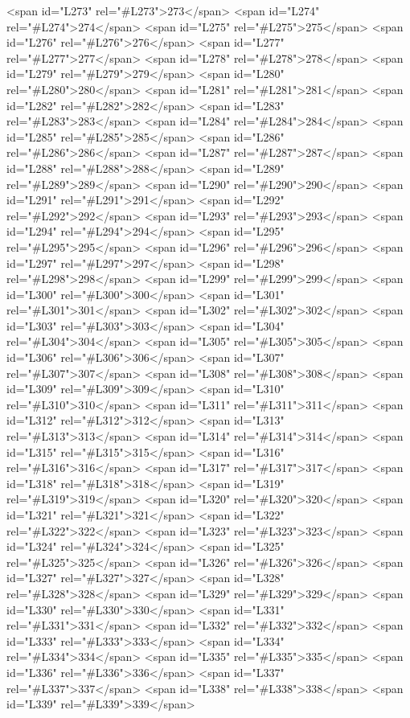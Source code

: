 <span id="L273" rel="#L273">273</span>
<span id="L274" rel="#L274">274</span>
<span id="L275" rel="#L275">275</span>
<span id="L276" rel="#L276">276</span>
<span id="L277" rel="#L277">277</span>
<span id="L278" rel="#L278">278</span>
<span id="L279" rel="#L279">279</span>
<span id="L280" rel="#L280">280</span>
<span id="L281" rel="#L281">281</span>
<span id="L282" rel="#L282">282</span>
<span id="L283" rel="#L283">283</span>
<span id="L284" rel="#L284">284</span>
<span id="L285" rel="#L285">285</span>
<span id="L286" rel="#L286">286</span>
<span id="L287" rel="#L287">287</span>
<span id="L288" rel="#L288">288</span>
<span id="L289" rel="#L289">289</span>
<span id="L290" rel="#L290">290</span>
<span id="L291" rel="#L291">291</span>
<span id="L292" rel="#L292">292</span>
<span id="L293" rel="#L293">293</span>
<span id="L294" rel="#L294">294</span>
<span id="L295" rel="#L295">295</span>
<span id="L296" rel="#L296">296</span>
<span id="L297" rel="#L297">297</span>
<span id="L298" rel="#L298">298</span>
<span id="L299" rel="#L299">299</span>
<span id="L300" rel="#L300">300</span>
<span id="L301" rel="#L301">301</span>
<span id="L302" rel="#L302">302</span>
<span id="L303" rel="#L303">303</span>
<span id="L304" rel="#L304">304</span>
<span id="L305" rel="#L305">305</span>
<span id="L306" rel="#L306">306</span>
<span id="L307" rel="#L307">307</span>
<span id="L308" rel="#L308">308</span>
<span id="L309" rel="#L309">309</span>
<span id="L310" rel="#L310">310</span>
<span id="L311" rel="#L311">311</span>
<span id="L312" rel="#L312">312</span>
<span id="L313" rel="#L313">313</span>
<span id="L314" rel="#L314">314</span>
<span id="L315" rel="#L315">315</span>
<span id="L316" rel="#L316">316</span>
<span id="L317" rel="#L317">317</span>
<span id="L318" rel="#L318">318</span>
<span id="L319" rel="#L319">319</span>
<span id="L320" rel="#L320">320</span>
<span id="L321" rel="#L321">321</span>
<span id="L322" rel="#L322">322</span>
<span id="L323" rel="#L323">323</span>
<span id="L324" rel="#L324">324</span>
<span id="L325" rel="#L325">325</span>
<span id="L326" rel="#L326">326</span>
<span id="L327" rel="#L327">327</span>
<span id="L328" rel="#L328">328</span>
<span id="L329" rel="#L329">329</span>
<span id="L330" rel="#L330">330</span>
<span id="L331" rel="#L331">331</span>
<span id="L332" rel="#L332">332</span>
<span id="L333" rel="#L333">333</span>
<span id="L334" rel="#L334">334</span>
<span id="L335" rel="#L335">335</span>
<span id="L336" rel="#L336">336</span>
<span id="L337" rel="#L337">337</span>
<span id="L338" rel="#L338">338</span>
<span id="L339" rel="#L339">339</span>
